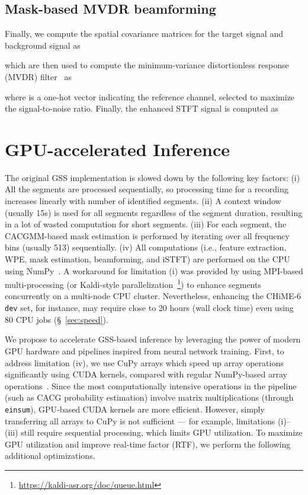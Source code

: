 \documentclass[a4paper]{article}
\begin{document}
\subsection{Mask-based MVDR beamforming}
\label{sec:mvdr}

Finally, we compute the spatial covariance matrices for the target signal and background signal as

which are then used to compute the minimum-variance distortionless response (MVDR) filter~\cite{Souden2010OnOF,Erdogan2016ImprovedMB} as

where  is a one-hot vector indicating the reference channel, selected to maximize the signal-to-noise ratio. Finally, the enhanced STFT signal is computed as


\section{GPU-accelerated Inference}
\label{sec:method}



The original GSS implementation is slowed down by the following key factors: (i) All the segments are processed sequentially, so processing time for a recording increases linearly with number of identified segments. (ii) A context window (usually 15s) is used for all segments regardless of the segment duration, resulting in a lot of wasted computation for short segments. (iii) For each segment, the CACGMM-based mask estimation is performed by iterating over all frequency bins (usually 513) sequentially. (iv) All computations (i.e., feature extraction, WPE, mask estimation, beamforming, and iSTFT) are performed on the CPU using NumPy~\cite{Harris2020ArrayPW}. A workaround for limitation (i) was provided by using MPI-based multi-processing (or Kaldi-style parallelization~\footnote{\url{https://kaldi-asr.org/doc/queue.html}}) to enhance segments concurrently on a multi-node CPU cluster. Nevertheless, enhancing the CHiME-6 \texttt{dev} set, for instance, may require close to 20 hours (wall clock time) even using 80 CPU jobs (\S~\ref{sec:speed}).  

We propose to accelerate GSS-based inference by leveraging the power of modern GPU hardware and pipelines inspired from neural network training. First, to address limitation (iv), we use CuPy arrays which speed up array operations significantly using CUDA kernels, compared with regular NumPy-based array operations~\cite{cupy_learningsys2017}. Since the most computationally intensive operations in the pipeline (such as CACG probability estimation) involve matrix multiplications (through \texttt{einsum}), GPU-based CUDA kernels are more efficient. However, simply transferring all arrays to CuPy is not sufficient --- for example, limitations (i)--(iii) still require sequential processing, which limits GPU utilization. To maximize GPU utilization and improve real-time factor (RTF), we perform the following additional optimizations.
\end{document}
